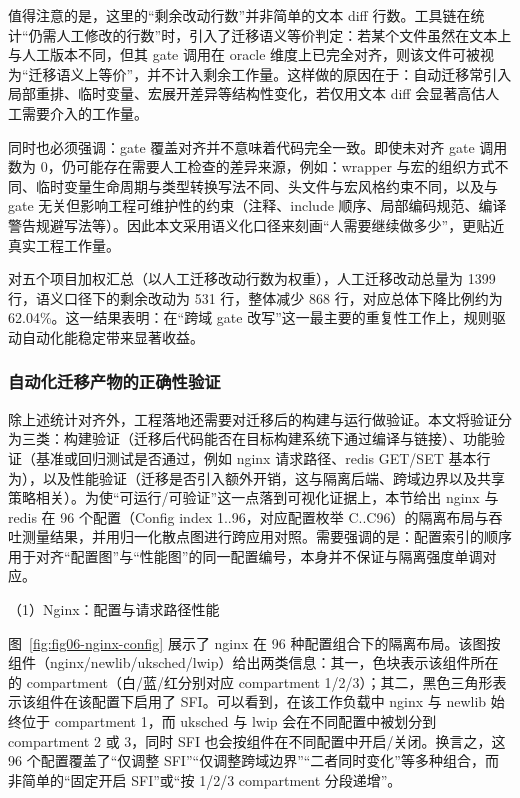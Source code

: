 \documentclass[UTF8,a4paper,12pt]{ctexart}
\numberwithin{equation}{section}
\begin{document}
值得注意的是，这里的``剩余改动行数''并非简单的文本 diff
行数。工具链在统计``仍需人工修改的行数''时，引入了迁移语义等价判定：若某个文件虽然在文本上与人工版本不同，但其
gate 调用在 oracle
维度上已完全对齐，则该文件可被视为``迁移语义上等价''，并不计入剩余工作量。这样做的原因在于：自动迁移常引入局部重排、临时变量、宏展开差异等结构性变化，若仅用文本
diff 会显著高估人工需要介入的工作量。

同时也必须强调：gate 覆盖对齐并不意味着代码完全一致。即使未对齐 gate
调用数为 0，仍可能存在需要人工检查的差异来源，例如：wrapper
与宏的组织方式不同、临时变量生命周期与类型转换写法不同、头文件与宏风格约束不同，以及与
gate 无关但影响工程可维护性的约束（注释、include
顺序、局部编码规范、编译警告规避写法等）。因此本文采用语义化口径来刻画``人需要继续做多少''，更贴近真实工程工作量。

对五个项目加权汇总（以人工迁移改动行数为权重），人工迁移改动总量为 1399
行，语义口径下的剩余改动为 531 行，整体减少 868 行，对应总体下降比例约为
62.04\%。这一结果表明：在``跨域 gate
改写''这一最主要的重复性工作上，规则驱动自动化能稳定带来显著收益。


\subsubsection{自动化迁移产物的正确性验证}

除上述统计对齐外，工程落地还需要对迁移后的构建与运行做验证。本文将验证分为三类：构建验证（迁移后代码能否在目标构建系统下通过编译与链接）、功能验证（基准或回归测试是否通过，例如 nginx 请求路径、redis GET/SET 基本行为），以及性能验证（迁移是否引入额外开销，这与隔离后端、跨域边界以及共享策略相关）。为使“可运行/可验证”这一点落到可视化证据上，本节给出 nginx 与 redis 在 96 个配置（Config index 1..96，对应配置枚举 C..C96）的隔离布局与吞吐测量结果，并用归一化散点图进行跨应用对照。需要强调的是：配置索引的顺序用于对齐“配置图”与“性能图”的同一配置编号，本身并不保证与隔离强度单调对应。

（1）Nginx：配置与请求路径性能

图~\ref{fig:fig06-nginx-config} 展示了 nginx 在 96 种配置组合下的隔离布局。该图按组件（nginx/newlib/uksched/lwip）给出两类信息：其一，色块表示该组件所在的 compartment（白/蓝/红分别对应 compartment 1/2/3）；其二，黑色三角形表示该组件在该配置下启用了 SFI。可以看到，在该工作负载中 nginx 与 newlib 始终位于 compartment 1，而 uksched 与 lwip 会在不同配置中被划分到 compartment 2 或 3，同时 SFI 也会按组件在不同配置中开启/关闭。换言之，这 96 个配置覆盖了“仅调整 SFI”“仅调整跨域边界”“二者同时变化”等多种组合，而非简单的“固定开启 SFI”或“按 1/2/3 compartment 分段递增”。
\end{document}
